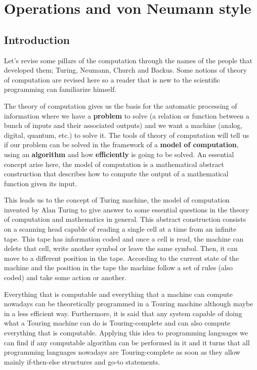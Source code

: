 \chapter{Operations and von Neumann style} 



\section{Introduction}

Let's revise some pillars of the computation through the names of the people that developed them; Turing, Neumann, Church and Backus. 
Some notions of theory of computation are revised here so a reader that is new to the scientific programming can familiarize himself. 

The theory of computation gives us the basis for the automatic processing of information where we have a \textbf{problem} to solve (a relation or function between a bunch of inputs and their associated outputs) and we want a machine (analog, digital, quantum, etc.) to solve it. 
The tools of theory of computation will tell us if our problem can be solved in the framework of a \textbf{model of computation}, using an \textbf{algorithm} and how \textbf{efficiently} is going to be solved. 
An essential concept arise here, the model of computation is a mathematical abstract construction that describes how to compute the output of a mathematical function given its input. 

This leads us to the concept of Turing machine, the model of computation invented by Alan Turing to give answer to some essential questions in the theory of computation and mathematics in general. This abstract construction consists on a scanning head capable of reading a single cell at a time from an infinite tape. This tape has information coded and once a cell is read, the machine can delete that cell, write another symbol or leave the same symbol. Then, it can move to a different position in the tape. According to the current state of the machine and the position in the tape the machine follow a set of rules (also coded) and take some action or another. 

Everything that is computable and everything that a machine can compute nowadays can be theoretically programmed in a Touring machine although maybe in a less efficient way. Furthermore, it is said that any system capable of doing what a Touring machine can do is Touring-complete and can also compute everything that is computable. Applying this idea to programming languages we can find if any computable algorithm can be performed in it and it turns that all programming languages nowadays are Touring-complete as soon as they allow mainly if-then-else structures and go-to statements. 




